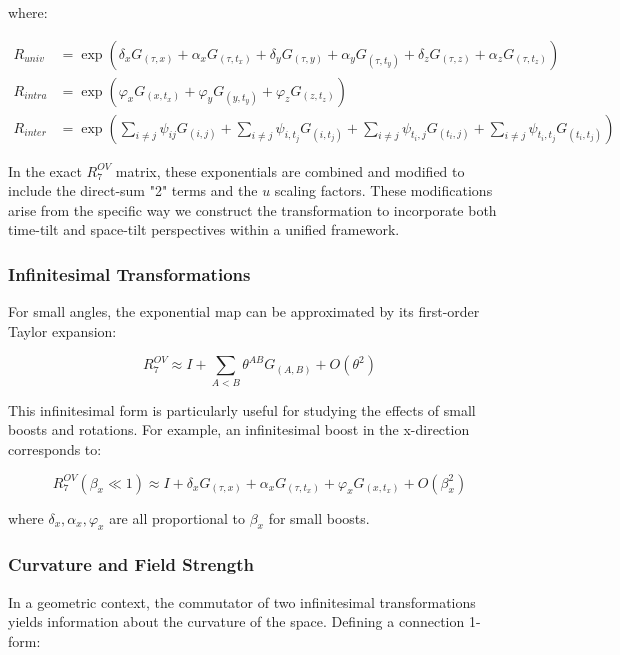 \documentclass{article}
\begin{document}
where:

\begin{align}
R_{univ} &= \exp\left(\delta_x G_{(\tau,x)} + \alpha_x G_{(\tau,t_x)} + \delta_y G_{(\tau,y)} + \alpha_y G_{(\tau,t_y)} + \delta_z G_{(\tau,z)} + \alpha_z G_{(\tau,t_z)}\right) \\
R_{intra} &= \exp\left(\varphi_x G_{(x,t_x)} + \varphi_y G_{(y,t_y)} + \varphi_z G_{(z,t_z)}\right) \\
R_{inter} &= \exp\left(\sum_{i \neq j} \psi_{ij} G_{(i,j)} + \sum_{i \neq j} \psi_{i,t_j} G_{(i,t_j)} + \sum_{i \neq j} \psi_{t_i,j} G_{(t_i,j)} + \sum_{i \neq j} \psi_{t_i,t_j} G_{(t_i,t_j)}\right)
\end{align}

In the exact $R^{OV}_7$ matrix, these exponentials are combined and modified to include the direct-sum "2" terms and the $u$ scaling factors. These modifications arise from the specific way we construct the transformation to incorporate both time-tilt and space-tilt perspectives within a unified framework.

\subsubsection{Infinitesimal Transformations}

For small angles, the exponential map can be approximated by its first-order Taylor expansion:

\begin{equation}
R^{OV}_7 \approx I + \sum_{A<B} \theta^{AB} G_{(A,B)} + O(\theta^2)
\end{equation}

This infinitesimal form is particularly useful for studying the effects of small boosts and rotations. For example, an infinitesimal boost in the x-direction corresponds to:

\begin{equation}
R^{OV}_7(\beta_x \ll 1) \approx I + \delta_x G_{(\tau,x)} + \alpha_x G_{(\tau,t_x)} + \varphi_x G_{(x,t_x)} + O(\beta_x^2)
\end{equation}

where $\delta_x, \alpha_x, \varphi_x$ are all proportional to $\beta_x$ for small boosts.

\subsubsection{Curvature and Field Strength}

In a geometric context, the commutator of two infinitesimal transformations yields information about the curvature of the space. Defining a connection 1-form:
\end{document}

